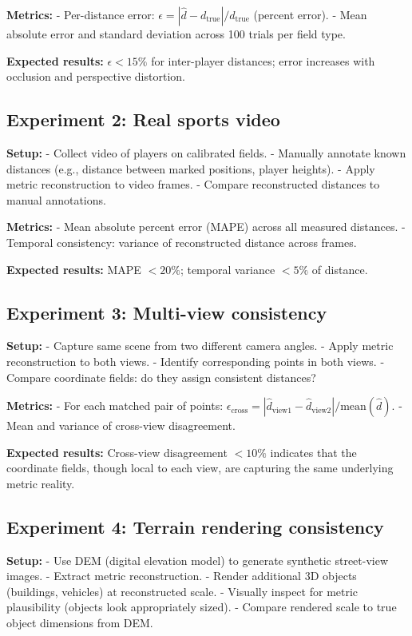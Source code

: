 \documentclass[11pt,twocolumn,a4paper]{article}
\theoremstyle{definition}
\begin{document}
\textbf{Metrics:}
- Per-distance error: $\epsilon = |\hat{d} - d_{\text{true}}| / d_{\text{true}}$ (percent error).
- Mean absolute error and standard deviation across 100 trials per field type.

\textbf{Expected results:} $\epsilon < 15\%$ for inter-player distances; error increases with occlusion and perspective distortion.

\subsection{Experiment 2: Real sports video}

\textbf{Setup:}
- Collect video of players on calibrated fields.
- Manually annotate known distances (e.g., distance between marked positions, player heights).
- Apply metric reconstruction to video frames.
- Compare reconstructed distances to manual annotations.

\textbf{Metrics:}
- Mean absolute percent error (MAPE) across all measured distances.
- Temporal consistency: variance of reconstructed distance across frames.

\textbf{Expected results:} MAPE $< 20\%$; temporal variance $< 5\%$ of distance.

\subsection{Experiment 3: Multi-view consistency}

\textbf{Setup:}
- Capture same scene from two different camera angles.
- Apply metric reconstruction to both views.
- Identify corresponding points in both views.
- Compare coordinate fields: do they assign consistent distances?

\textbf{Metrics:}
- For each matched pair of points: $\epsilon_{\text{cross}} = |\hat{d}_{\text{view1}} - \hat{d}_{\text{view2}}| / \text{mean}(\hat{d})$.
- Mean and variance of cross-view disagreement.

\textbf{Expected results:} Cross-view disagreement $< 10\%$ indicates that the coordinate fields, though local to each view, are capturing the same underlying metric reality.

\subsection{Experiment 4: Terrain rendering consistency}

\textbf{Setup:}
- Use DEM (digital elevation model) to generate synthetic street-view images.
- Extract metric reconstruction.
- Render additional 3D objects (buildings, vehicles) at reconstructed scale.
- Visually inspect for metric plausibility (objects look appropriately sized).
- Compare rendered scale to true object dimensions from DEM.
\end{document}
